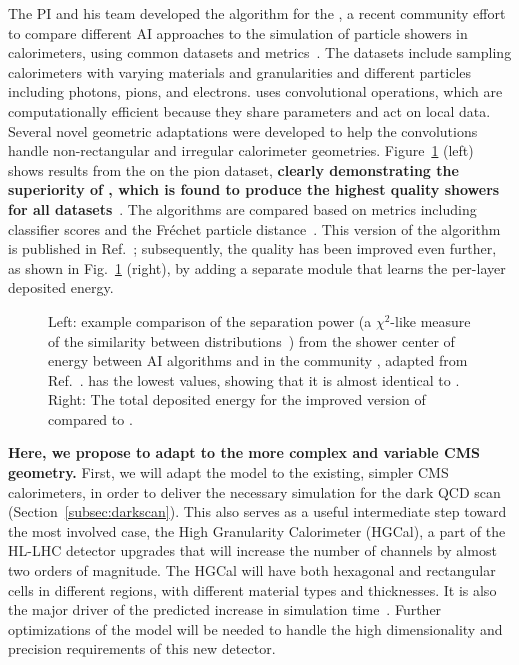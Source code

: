 The PI and his team developed the \diffu algorithm for the \challenge,
a recent community effort to compare different AI approaches to the simulation of particle showers in calorimeters, using common datasets and metrics~\cite{CaloChallenge}.
The datasets include sampling calorimeters with varying materials and granularities and different particles including photons, pions, and electrons.
\diffu uses convolutional operations, which are computationally efficient because they share parameters and act on local data.
Several novel geometric adaptations were developed to help the convolutions handle non-rectangular and irregular calorimeter geometries.
Figure~\ref{fig:calodiffu} (left) shows results from the \challenge on the pion dataset, \textbf{clearly demonstrating the superiority of \diffu,
which is found to produce the highest quality showers for all datasets}~\cite{Krause:2023mlj}.
The algorithms are compared based on metrics including classifier scores and the Fr\'echet particle distance~\cite{Kansal:2022spb}.
This version of the algorithm is published in Ref.~\cite{Amram:2023onf};
subsequently, the quality has been improved even further, as shown in Fig.~\ref{fig:calodiffu} (right), by adding a separate module that learns the per-layer deposited energy.

\begin{figure}[htb!]
\centering
{}
\caption{Left: example comparison of the separation power (a $\chi^2$-like measure of the similarity between distributions~\cite{Diefenbacher:2020rna})
from the shower center of energy between AI algorithms and \GEANTfour in the community \challenge, adapted from Ref.~\cite{Krause:2023mlj}.
\diffu has the lowest values, showing that it is almost identical to \GEANTfour.
Right: The total deposited energy for the improved version of \diffu compared to \GEANTfour.}
\label{fig:calodiffu}
\end{figure}

\textbf{Here, we propose to adapt \diffu to the more complex and variable CMS geometry.}
First, we will adapt the model to the existing, simpler CMS calorimeters,
in order to deliver the necessary simulation for the dark QCD scan (Section~\ref{subsec:darkscan}).
This also serves as a useful intermediate step toward the most involved case,
the High Granularity Calorimeter (HGCal), a part of the HL-LHC detector upgrades
that will increase the number of channels by almost two orders of magnitude.
The HGCal will have both hexagonal and rectangular cells in different regions, with different material types and thicknesses.
It is also the major driver of the predicted increase in \GEANTfour simulation time~\cite{Pedro:2020kbk}.
Further optimizations of the \diffu model will be needed to handle the high dimensionality and precision requirements of this new detector.

